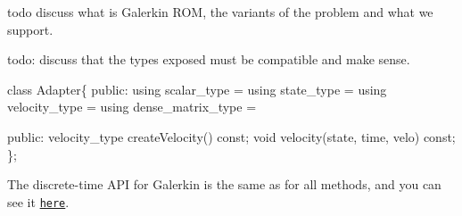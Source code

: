 todo discuss what is Galerkin R\+OM, the variants of the problem and what we support.

todo\+: discuss that the types exposed must be compatible and make sense.

 
\begin{DoxyCode}
\textcolor{keyword}{class }Adapter\{
\textcolor{keyword}{public}:
  \textcolor{keyword}{using} scalar\_type =
  \textcolor{keyword}{using} state\_type =
  \textcolor{keyword}{using} velocity\_type =
  \textcolor{keyword}{using} dense\_matrix\_type =

\textcolor{keyword}{public}:
  velocity\_type createVelocity() \textcolor{keyword}{const};
  \textcolor{keywordtype}{void} velocity(state, time, velo) \textcolor{keyword}{const};
\};
\end{DoxyCode}
 

The discrete-\/time A\+PI for Galerkin is the same as for all methods, and you can see it \href{./md_pages_adapter_apis_adapter_discrete_time_api.html}{\tt here}. 